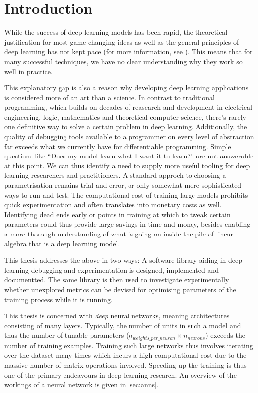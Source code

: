 \chapter{Introduction}\label{sec:introduction}

While the success of deep learning models has been rapid, the theoretical
justification for most game-changing ideas as well as the general principles of
deep learning has not kept pace (for more information, see \cite{arora2018}).
This means that for many successful techniques, we have no clear understanding
why they work so well in practice.

This explanatory gap is also a reason why developing deep learning applications
is considered more of an art than a science. In contrast to traditional
programming, which builds on decades of reasearch and development in electrical
engineering, logic, mathematics and theoretical computer science, there's rarely
one definitive way to solve a certain problem in deep learning.  Additionally,
the quality of debugging tools available to a programmer on every level of
abstraction far exceeds what we currently have for differentiable programming.
Simple questions like ``Does my model learn what I want it to learn?'' are not
answerable at this point.  We can thus identify a need to supply more useful
tooling for deep learning researchers and practitioners.  A standard approch to
choosing a parametrisation remains trial-and-error, or only somewhat more
sophisticated ways to run and test.  The computational cost of training large
models prohibits quick experimentation and often translates into monetary costs
as well.  Identifying dead ends early or points in training at which to tweak
certain parameters could thus provide large savings in time and money, besides
enabling a more thorough understanding of what is going on inside the pile of
linear algebra that is a deep learning model.

This thesis addresses the above in two ways: A software library aiding in deep
learning debugging and experimentation is designed, implemented and documentted. The same
library is then used to investigate experimentally whether unexplored
metrics can be devised for optimising parameters of the training process while it is running.

This thesis is concerned with \emph{deep} neural networks, meaning
architectures consisting of many layers. Typically, the number of units
in such a model and thus the number of tunable parameters
(\(n_{weights\_per\_neuron} \times n_{neurons}\)) exceeds the number of
training examples. Training such large networks thus involves iterating
over the dataset many times which incurs a high computational cost due
to the massive number of matrix operations involved. Speeding up the
training is thus one of the primary endeavours in deep learning
research. An overview of the workings of a neural network is given in
\cref{sec:anns}.

